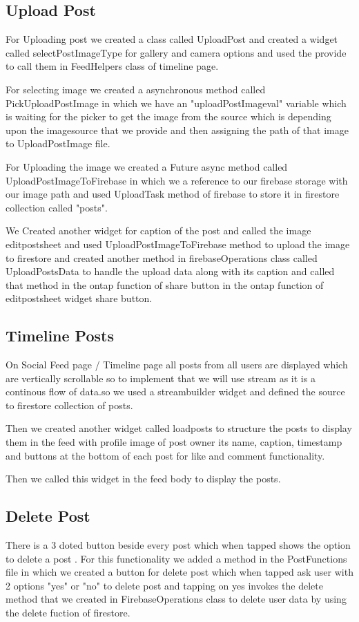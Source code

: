 \subsection{Upload Post}

For Uploading post we created a class called UploadPost and created a widget called selectPostImageType for gallery and camera options and used the provide to call them in FeedHelpers class of timeline page.

For selecting image we created a asynchronous method called PickUploadPostImage in which we have an "uploadPostImageval" variable which is waiting for the picker to get the image from the source which is depending upon the imagesource that we provide and then assigning the path of that image to UploadPostImage file.

For Uploading the image we created a Future async method called UploadPostImageToFirebase in which we a reference to our firebase storage with our image path and used UploadTask method of firebase to store it in firestore collection called "posts".

We Created another widget for caption of the post and called the image editpostsheet and used UploadPostImageToFirebase method to upload the image to firestore and created another method in firebaseOperations class called UploadPostsData to handle the upload data along with its caption and called that method in the ontap function of share button in the ontap function of editpostsheet widget share button.

\subsection{Timeline Posts}
On Social Feed page / Timeline page all posts from all users are displayed which are vertically scrollable so to implement that we will use stream as it is a continous flow of data.so we used a streambuilder widget and defined the source to firestore collection of posts.

Then we created another widget called loadposts to structure the posts to display them in the feed with profile image of post owner its name, caption, timestamp and buttons at the bottom of each post for like and comment functionality.

Then we called this widget in the feed body to display the posts.

\subsection{Delete Post}
There is a 3 doted button beside every post which when tapped shows the option to delete a post .
For this functionality we added a method in the PostFunctions file in which we created a button for delete post which when tapped ask user with 2 options "yes" or "no" to delete post and tapping on yes invokes the delete method that we created in FirebaseOperations class to delete user data by using the delete fuction of firestore.

